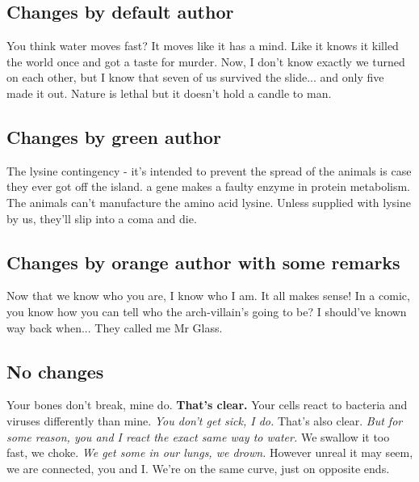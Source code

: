 \documentclass[11pt, a4paper, notitlepage, english]{article}
\begin{document}
\listofchanges

\subsection*{Changes by default author}

You think water moves fast?
It moves like it has a mind.
Like it knows it killed the world once and got a taste for murder.
Now, I don't know exactly  we turned on each other, but I know that seven of us survived the slide... and only five made it out.
Nature is lethal but it doesn't hold a candle to man.

\subsection*{Changes by green author}

The lysine contingency - it's intended to prevent the spread of the animals is case they ever got off the island.
 a gene  makes a  faulty enzyme in protein metabolism.
The animals can't manufacture the amino acid lysine.
Unless  supplied with lysine by us, they'll slip into a coma and die.

\subsection*{Changes by orange author with some remarks}

Now that we know who you are, I know who I am.
It all makes sense!
In a comic, you know how you can tell who the arch-villain's going to be?
I should've known way back when...
They called me Mr Glass.

\subsection*{No changes}

Your bones don't break, mine do.
\textbf{That's clear.}
Your cells react to bacteria and viruses differently than mine.
\textsl{You don't get sick, I do.}
That's also clear.
\textit{But for some reason, you and I react the exact same way to water.}
We swallow it too fast, we choke.
\emph{We get some in our lungs, we drown.}
However unreal it may seem, we are connected, you and I.
We're on the same curve, just on opposite ends.
\end{document}
